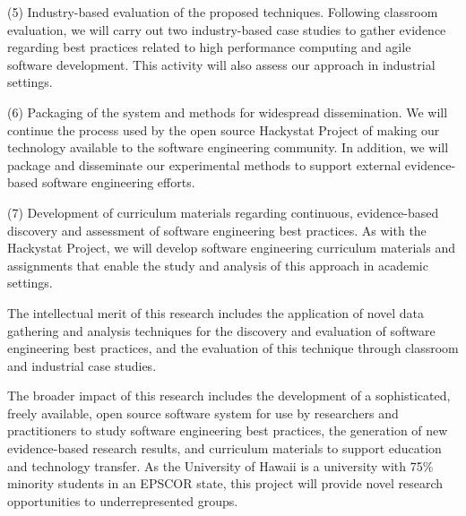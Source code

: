 \documentclass[11pt]{article}
\begin{document}
(5) Industry-based evaluation of the proposed techniques. Following
classroom evaluation, we will carry out two industry-based case studies
to gather evidence regarding best practices related to high performance computing 
and agile software development. This activity will also assess our approach
in industrial settings. 
  
(6) Packaging of the system and methods for widespread dissemination.  We
will continue the process used by the open source Hackystat Project of making
our technology available to the software engineering community.  In addition, 
we will package and disseminate our experimental methods to support external
evidence-based software engineering efforts. 
  
(7) Development of curriculum materials regarding continuous,
  evidence-based discovery and assessment of software engineering best
  practices. As with the Hackystat Project, we will develop software engineering
  curriculum materials and assignments that enable the study and analysis
  of this approach in academic settings.

The intellectual merit of this research includes the application of novel
data gathering and analysis techniques for the discovery and evaluation of 
software engineering best practices, and the evaluation of this technique
through classroom and industrial case studies. 

The broader impact of this research includes the development of a
sophisticated, freely available, open source software system for use by
researchers and practitioners to study software engineering best practices,
the generation of new evidence-based research results, and curriculum
materials to support education and technology transfer.  As the University
of Hawaii is a university with 75\% minority students in an EPSCOR state,
this project will provide novel research opportunities to underrepresented
groups.
\end{document}
